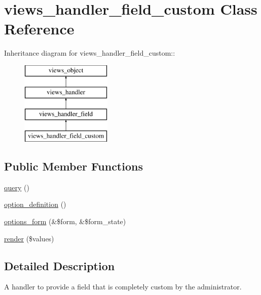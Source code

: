\hypertarget{classviews__handler__field__custom}{
\section{views\_\-handler\_\-field\_\-custom Class Reference}
\label{classviews__handler__field__custom}
}
Inheritance diagram for views\_\-handler\_\-field\_\-custom::\begin{figure}[H]
\begin{center}
\leavevmode
\includegraphics[height=4cm]{classviews__handler__field__custom}
\end{center}
\end{figure}
\subsection*{Public Member Functions}
\begin{CompactItemize}
\item 
\hyperlink{classviews__handler__field__custom_153c21f3d05ff9f27e345f2c98058bc4}{query} ()
\item 
\hyperlink{classviews__handler__field__custom_4089ad30293453649f51d4a68005bea1}{option\_\-definition} ()
\item 
\hyperlink{classviews__handler__field__custom_886688de7d2ac5bc4ef3b588a2e5056a}{options\_\-form} (\&\$form, \&\$form\_\-state)
\item 
\hyperlink{classviews__handler__field__custom_0498d3ad0dff40c9e49ec599363c2157}{render} (\$values)
\end{CompactItemize}


\subsection{Detailed Description}
A handler to provide a field that is completely custom by the administrator. 

